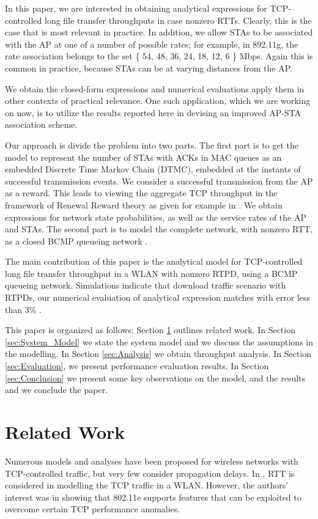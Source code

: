 \documentclass[conference]{IEEEtran}
\begin{document}
In this paper, we are interested in obtaining analytical expressions for 
TCP-controlled long file transfer throughputs in case nonzero RTTs. Clearly, 
this is the case that is most relevant in practice. In addition, we allow STAs
to be associated with the AP at one of a number of possible rates; for example,
in 892.11g, the rate association belongs to the set \{ 54, 48, 36, 24, 18,
12, 6 \} Mbps. Again this is common in practice, because STAs can be at varying 
distances from the AP.

We obtain the closed-form expressions and numerical evaluations  apply them in other contexts of practical relevance.  One such application, 
which we are working on now, is to utilize the results reported here in devising
an improved AP-STA association scheme. 

Our approach is divide the problem into two parts. The first part is to get the
model to represent the number of STAs with ACKs in MAC queues as an embedded 
Discrete Time Markov Chain (DTMC), embedded at the instants of successful 
transmission events. We consider a successful 
transmission from the AP as a reward. This leads to viewing the aggregate TCP
throughput in the framework of Renewal Reward theory as given for example in 
\cite{astn_model:Wolff}. We obtain expressions for network state 
probabilities, as well as the service rates of the AP and STAs. The second part
is to model the complete network, with nonzero RTT, as a closed BCMP queueing
network \cite{astn_model:bcmp}.

The main contribution of this paper is the analytical model for TCP-controlled
long file transfer throughput in a WLAN with nonzero RTPD, using a BCMP 
queueing network. Simulations indicate 
that download traffic scenario with RTPDs, our numerical
evaluation of analytical expression matches with error less than 3\% .

This paper is organized as follows: Section \ref{sec:Related_Work} outlines
related work. 
In Section \ref{sec:System_Model} we state the system model and we discuss
the assumptions in the modelling. 
In Section \ref{sec:Analysis} we obtain throughput analysis. 
In Section \ref{sec:Evaluation}, we present performance evaluation results. 
In Section \ref{sec:Conclusion} we present some key observations on the model,
and the results and we conclude the paper.
\section{Related Work}\label{sec:Related_Work} 
Numerous models and analyses have been proposed for wireless networks with 
TCP-controlled traffic, but very few consider propagation delays.
In \cite{astn_model:Leith}, RTT is considered in modelling the TCP traffic 
in a WLAN. However, the authors' interest was in showing that 802.11e supports
features that can be exploited to overcome certain TCP performance anomalies. 
\end{document}
